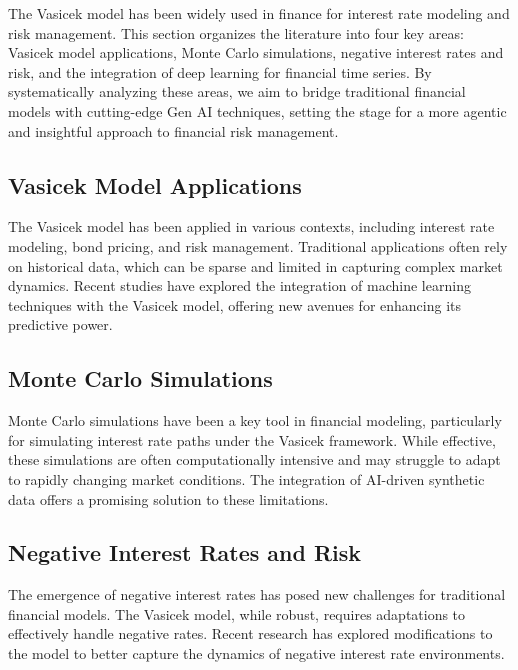 \documentclass[a4paper,12pt]{scrbook}
\begin{document}
	
	The Vasicek model has been widely used in finance for interest rate modeling and risk management. This section organizes the literature into four key areas: Vasicek model applications, Monte Carlo simulations, negative interest rates and risk, and the integration of deep learning for financial time series. By systematically analyzing these areas, we aim to bridge traditional financial models with cutting-edge Gen AI techniques, setting the stage for a more agentic and insightful approach to financial risk management.
	
	\subsection{Vasicek Model Applications}
	
	The Vasicek model has been applied in various contexts, including interest rate modeling, bond pricing, and risk management. Traditional applications often rely on historical data, which can be sparse and limited in capturing complex market dynamics. Recent studies have explored the integration of machine learning techniques with the Vasicek model, offering new avenues for enhancing its predictive power.
	
	\subsection{Monte Carlo Simulations}
	
	Monte Carlo simulations have been a key tool in financial modeling, particularly for simulating interest rate paths under the Vasicek framework. While effective, these simulations are often computationally intensive and may struggle to adapt to rapidly changing market conditions. The integration of AI-driven synthetic data offers a promising solution to these limitations.
	
	\subsection{Negative Interest Rates and Risk}
	
	The emergence of negative interest rates has posed new challenges for traditional financial models. The Vasicek model, while robust, requires adaptations to effectively handle negative rates. Recent research has explored modifications to the model to better capture the dynamics of negative interest rate environments.
	
\end{document}
